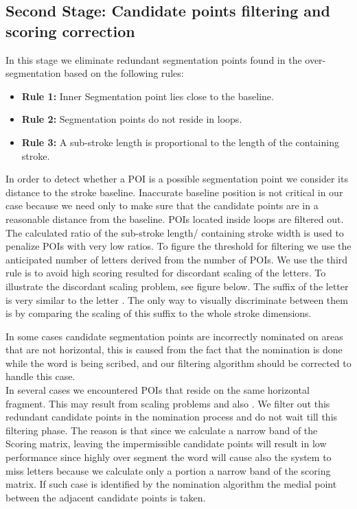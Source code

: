 \documentclass[journal,compsoc]{IEEEtran}
\begin{document}
\subsection{Second Stage: Candidate points filtering and scoring correction}
In this stage we eliminate redundant segmentation points found in the over-segmentation based on the following rules:

\begin{itemize}
	\item[] \textbf{Rule 1:} Inner Segmentation point lies close to the baseline. 
	\item[] \textbf{Rule 2:} Segmentation points do not reside in loops.
	\item[] \textbf{Rule 3:} A sub-stroke length is proportional to the length of the containing stroke.
\end{itemize}

In order to detect whether a POI is a possible segmentation point we consider its distance to the stroke baseline. Inaccurate baseline position is not critical in our case because we need only to make sure that the candidate points are in a reasonable distance from the baseline. POIs located inside loops are filtered out. The calculated ratio of the sub-stroke length/ containing stroke width is used to penalize POIs with very low ratios. To figure the threshold for filtering we use the anticipated number of letters derived from the number of POIs. We use the third rule is to avoid high scoring resulted for discordant scaling of the letters. To illustrate the discordant scaling problem, see figure below. The suffix of the letter  is very similar to the letter . The only way to visually discriminate between them is by comparing the scaling of this suffix to the whole stroke dimensions.

In some cases candidate segmentation points are incorrectly nominated on areas that are not horizontal, this is caused from the fact that the nomination is done while the word is being scribed, and our filtering algorithm should be corrected to handle this case.\\

In several cases we encountered POIs that reside on the same horizontal fragment. This may result from scaling problems and also  . We filter out this redundant candidate points in the nomination process and do not wait till this filtering phase. The reason is that since we calculate a narrow band of the Scoring matrix, leaving the impermissible candidate points will result in low performance since highly over segment the word will cause also the system to miss letters because we calculate only a portion a narrow band of the scoring matrix. If such case is identified by the nomination algorithm the medial point between the adjacent candidate points is taken.\\
\end{document}
